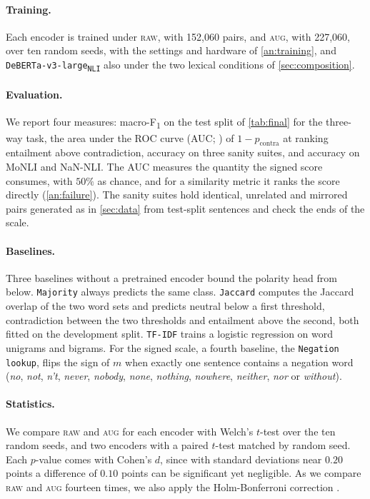 \documentclass[11pt]{article}
\begin{document}
\paragraph{Training.}
Each encoder is trained under \textsc{raw}, with 152{,}060 pairs, and \textsc{aug}, with 227{,}060, over ten random seeds, with the settings and hardware of \autoref{an:training}, and \texttt{DeBERTa-v3-large\textsubscript{NLI}} also under the two lexical conditions of \autoref{sec:composition}.

\paragraph{Evaluation.}
We report four measures: macro-F\textsubscript{1} \citep{sokolova2009systematic} on the test split of \autoref{tab:final} for the three-way task, the area under the ROC curve (AUC; \citealp{hanley1982auc}) of $1 - p_{\mathrm{contra}}$ at ranking entailment above contradiction, accuracy on three sanity suites, and accuracy on MoNLI and NaN-NLI.
The AUC measures the quantity the signed score consumes, with $50\%$ as chance, and for a similarity metric it ranks the score directly (\autoref{an:failure}).
The sanity suites hold identical, unrelated and mirrored pairs generated as in \autoref{sec:data} from test-split sentences and check the ends of the scale.

\paragraph{Baselines.}
Three baselines without a pretrained encoder bound the polarity head from below.
\texttt{Majority} always predicts the same class.
\texttt{Jaccard} computes the Jaccard overlap \citep{jaccard1912} of the two word sets and predicts neutral below a first threshold, contradiction between the two thresholds and entailment above the second, both fitted on the development split.
\texttt{TF-IDF} trains a logistic regression on word unigrams and bigrams.
For the signed scale, a fourth baseline, the \texttt{Negation lookup}, flips the sign of $m$ when exactly one sentence contains a negation word (\emph{no}, \emph{not}, \emph{n't}, \emph{never}, \emph{nobody}, \emph{none}, \emph{nothing}, \emph{nowhere}, \emph{neither}, \emph{nor} or \emph{without}).

\paragraph{Statistics.}
We compare \textsc{raw} and \textsc{aug} for each encoder with Welch's $t$-test \citep{welch1947} over the ten random seeds, and two encoders with a paired $t$-test matched by random seed.
Each $p$-value comes with Cohen's $d$, since with standard deviations near $0.20$ points a difference of $0.10$ points can be significant yet negligible.
As we compare \textsc{raw} and \textsc{aug} fourteen times, we also apply the Holm-Bonferroni correction \citep{holm1979}.
\end{document}
